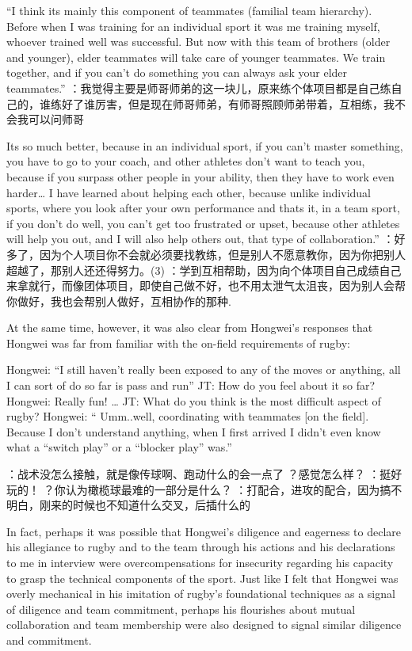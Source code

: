  ``I think its mainly this component of teammates (familial team hierarchy). Before when I was training for an individual sport it was me training myself, whoever trained well was successful.  But now with this team of brothers (older and younger), elder teammates will take care of younger teammates. We train together, and if you can’t do something you can always ask your elder teammates.''
：我觉得主要是师哥师弟的这一块儿，原来练个体项目都是自己练自己的，谁练好了谁厉害，但是现在师哥师弟，有师哥照顾师弟带着，互相练，我不会我可以问师哥

Its so much better, because in an individual sport, if you can’t master something, you have to go to your coach, and other athletes don’t want to teach you, because if you surpass other people in your ability, then they have to work even harder… I have learned about helping each other, because unlike individual sports, where you look after your own performance and thats it, in a team sport, if you don’t do well, you can’t get too frustrated or upset, because other athletes will help you out, and I will also help others out, that type of collaboration.''
：好多了，因为个人项目你不会就必须要找教练，但是别人不愿意教你，因为你把别人超越了，那别人还还得努力。(3) ：学到互相帮助，因为向个体项目自己成绩自己来拿就行，而像团体项目，即使自己做不好，也不用太泄气太沮丧，因为别人会帮你做好，我也会帮别人做好，互相协作的那种.

At the same time, however, it was also clear from Hongwei’s responses that Hongwei was far from familiar with the on-field requirements of rugby:

Hongwei: ``I still haven’t really been exposed to any of the moves or anything, all I can sort of do so far is pass and run''
JT: How do you feel about it so far?
Hongwei: Really fun!  …
JT: What do you think is the most difficult aspect of rugby?
Hongwei: `` Umm..well, coordinating with teammates [on the field].  Because I don’t understand anything, when I first arrived I didn’t even know what a ``switch play'' or a ``blocker play'' was.''

：战术没怎么接触，就是像传球啊、跑动什么的会一点了
？感觉怎么样？
：挺好玩的！
？你认为橄榄球最难的一部分是什么？
：打配合，进攻的配合，因为搞不明白，刚来的时候也不知道什么交叉，后插什么的

 In fact, perhaps it was possible that Hongwei's diligence and eagerness to declare his allegiance to rugby and to the team through his actions and his declarations to me in interview were overcompensations for insecurity regarding his capacity to grasp the technical components of the sport.  Just like I felt that Hongwei was overly mechanical in his imitation of rugby’s foundational techniques as a signal of diligence and team commitment, perhaps his flourishes about mutual collaboration and team membership were also designed to signal similar diligence and commitment.

